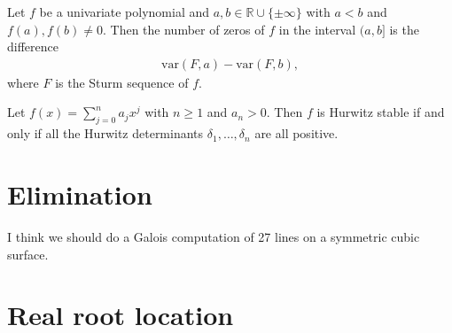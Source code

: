 \documentclass[12pt]{amsart}
\theoremstyle{definition}
\begin{document}


Let $f$ be a univariate polynomial and $a,b\in \mathbb{R}\cup\{\pm\infty\}$ with $a<b$ and $f(a),f(b)\neq 0$. Then the number of zeros of $f$ in the interval $(a,b]$ is the difference 
\begin{align*}
\text{var}(F,a) - \text{var}(F,b),
\end{align*}
where $F$ is the Sturm sequence of $f$.



\theorem
Let $f(x) = \sum_{j=0}^{n}a_{j}x^{j}$ with $n\geq 1$ and $a_{n}>0$. Then $f$ is Hurwitz stable if and only if all the Hurwitz determinants $\delta_{1},\dots,\delta_{n}$ are all positive.
%
%

\section{Elimination}
%

I think we should do a Galois computation of 27 lines on a symmetric cubic surface.


\section{Real root location}
%



%

\end{document}
